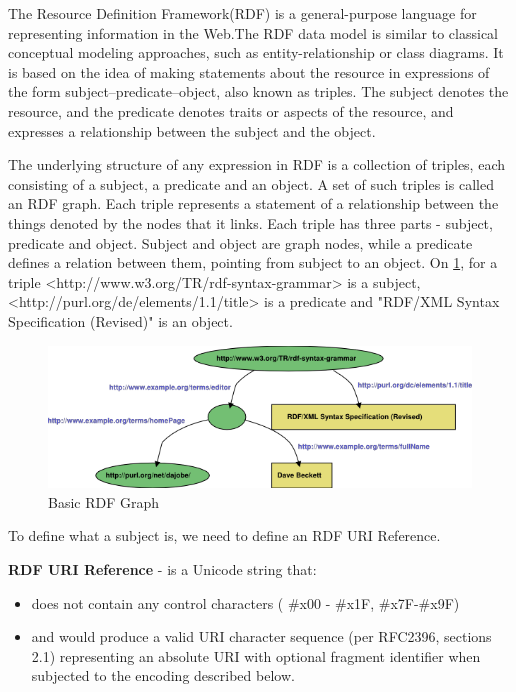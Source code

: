\documentclass[thesis=M,english,hidelinks]{FITthesis}[2019/12/23]
\begin{document}
The Resource Definition Framework(RDF) is a general-purpose language for representing information in the Web\cite{roussey2011}.The \gls{RDF} data model is similar to classical conceptual modeling approaches, such as entity-relationship or class diagrams. It is based on the idea of making statements about the resource in expressions of the form subject–predicate–object, also known as triples. The subject denotes the resource, and the predicate denotes traits or aspects of the resource, and expresses a relationship between the subject and the object\cite{rdf_syntax}.

The underlying structure of any expression in RDF is a collection of triples, each consisting of a subject, a predicate and an object. A set of such triples is called an RDF graph. Each triple represents a statement of a relationship between the things denoted by the nodes that it links. Each triple has three parts - subject, predicate and object\cite{rdf_concepts}. Subject and object are graph nodes, while a predicate defines a relation between them, pointing from subject to an object. On \ref{fig:basicrdfgraph}, for a triple <http://www.w3.org/TR/rdf-syntax-grammar> is a subject, <http://purl.org/de/elements/1.1/title> is a predicate and "RDF/XML Syntax Specification (Revised)" is an object.

\begin{figure}
	\centering
	\includegraphics[width=1.0\linewidth]{basic_rdf_graph}
	\caption{Basic RDF Graph\cite{rdf_syntax}}
	\label{fig:basicrdfgraph}
\end{figure}

To define what a subject is, we need to define an \gls{RDF} \gls{URI} Reference.

\textbf{\gls{RDF} \gls{URI} Reference} - is a Unicode string that:

\begin{itemize}
	\item does not contain any control characters ( \#x00 - \#x1F, \#x7F-\#x9F)
	\item and would produce a valid URI character sequence (per RFC2396\cite{rfc2396}, sections 2.1) representing an absolute URI with optional fragment identifier when subjected to the encoding described below.
\end{itemize}
\end{document}
